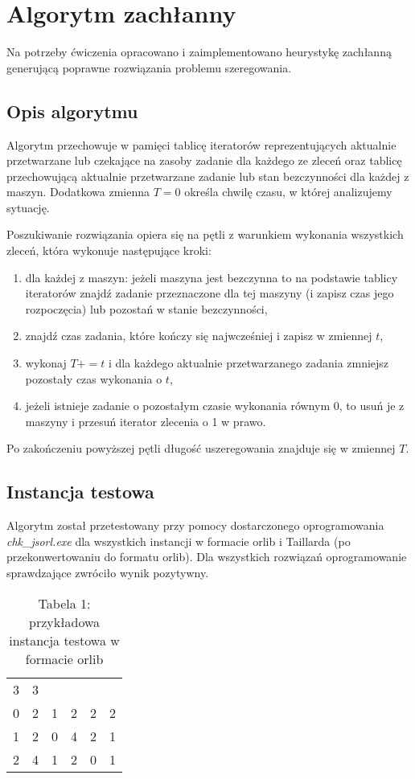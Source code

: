 \documentclass[10pt,a4paper]{article}
\begin{document}
\section{Algorytm zachłanny}
Na potrzeby ćwiczenia opracowano i zaimplementowano heurystykę zachłanną generującą poprawne rozwiązania problemu szeregowania.

\subsection{Opis algorytmu}
Algorytm przechowuje w pamięci tablicę iteratorów reprezentujących aktualnie przetwarzane lub czekające na zasoby zadanie dla każdego ze zleceń oraz tablicę przechowującą aktualnie przetwarzane zadanie lub stan bezczynności dla każdej z maszyn. Dodatkowa zmienna $T=0$ określa chwilę czasu, w której analizujemy sytuację.


Poszukiwanie rozwiązania opiera się na pętli z warunkiem wykonania wszystkich zleceń, która wykonuje następujące kroki:
\begin{enumerate}
    \item dla każdej z maszyn: jeżeli maszyna jest bezczynna to na podstawie tablicy iteratorów znajdź zadanie przeznaczone dla tej maszyny (i zapisz czas jego rozpoczęcia) lub pozostań w stanie bezczynności,
    \item znajdź czas zadania, które kończy się najwcześniej i zapisz w zmiennej $t$,
    \item wykonaj $T += t$ i dla każdego aktualnie przetwarzanego zadania zmniejsz pozostały czas wykonania o $t$,
    \item jeżeli istnieje zadanie o pozostałym czasie wykonania równym 0, to usuń je z maszyny i przesuń iterator zlecenia o 1 w prawo.
\end{enumerate}

Po zakończeniu powyższej pętli długość uszeregowania znajduje się w zmiennej $T$. 

\subsection{Instancja testowa}
Algorytm został przetestowany przy pomocy dostarczonego oprogramowania \textit{chk\_jsorl.exe} dla wszystkich instancji w formacie orlib i Taillarda (po przekonwertowaniu do formatu orlib). Dla wszystkich rozwiązań oprogramowanie sprawdzające zwróciło wynik pozytywny.

\begin{table}[H]
    \begin{center}
        \begin{tabular}{ l l l l l l }
            3 & 3 &&&& \\
            0 & 2 & 1 & 2 & 2 & 2\\
            1 & 2 & 0 & 4 & 2 & 1\\
            2 & 4 & 1 & 2 & 0 & 1
        \end{tabular}
        \caption*{Tabela 1: przykładowa instancja testowa w formacie orlib}
        \label{test1}
    \end{center}
\end{table}
\end{document}
